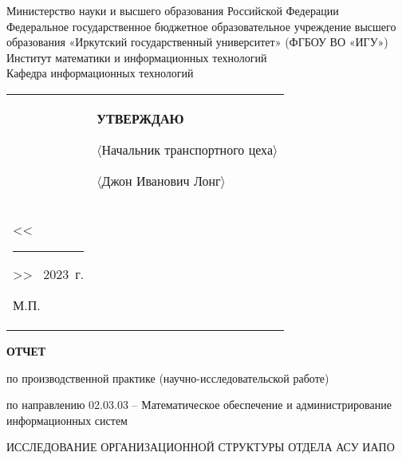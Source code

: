 \documentclass[732,14pt]{studrep}
\begin{document}
\thispagestyle{empty}
\begin{center}
Министерство науки и высшего образования Российской Федерации\\
Федеральное государственное бюджетное образовательное учреждение высшего образования
«Иркутский государственный университет»
(ФГБОУ ВО «ИГУ»)\\%
Институт математики и информационных технологий\\%
Кафедра информационных технологий\\%
\end{center}
\vspace{-1em}
\noindent\begin{tabularx}{\textwidth} {
  >{\raggedright\arraybackslash}X
  >{\raggedright}X }
&
  \begin{center}
    \textbf{УТВЕРЖДАЮ}
  \end{center}%
\vspace{-1em}
  \noindent $\langle$Начальник транспортного цеха$\rangle$

  \noindent $\langle$Джон Иванович Лонг$\rangle$ \\[0.3em]

  \noindent <<\rule{1cm}{0.5pt}>> \hrulefill\ 2023~г. %

\vspace{-1em}
  \begin{center}
    М.П.
  \end{center}

\end{tabularx}
\begin{center}
  \textbf{\large ОТЧЕТ}

  по производственной практике (научно-исследовательской работе)
\vspace{1em}

по направлению 02.03.03 -- Математическое обеспечение и администрирование информационных систем


\vspace{2em}
 ИССЛЕДОВАНИЕ ОРГАНИЗАЦИОННОЙ СТРУКТУРЫ ОТДЕЛА АСУ ИАПО

\end{center}
\end{document}
